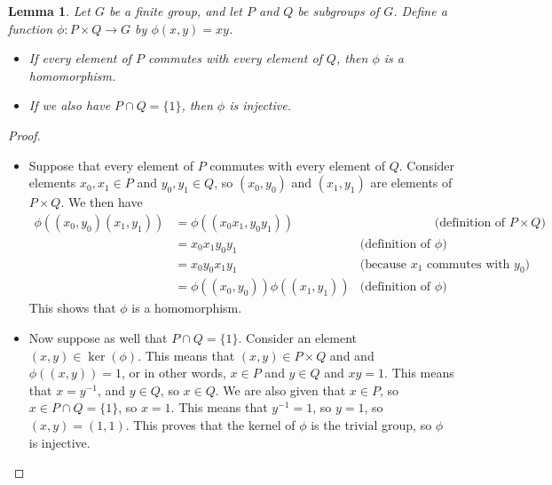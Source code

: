 \documentclass{amsart}
\newcommand{\tm}        {\times}
\newcommand{\xra}       {\xrightarrow}
\renewcommand{\:}{\colon}
\newtheorem{lemma}[theorem]{Lemma}
\theoremstyle{definition}
\begin{document}
\begin{lemma}\label{lem-commuting-product}
 Let $G$ be a finite group, and let $P$ and $Q$ be subgroups of $G$.
 Define a function $\phi\:P\tm Q\xra{}G$ by $\phi(x,y)=xy$.
 \begin{itemize}
  \item[(a)] If every element of $P$ commutes with every element of
   $Q$, then $\phi$ is a homomorphism.
  \item[(b)] If we also have $P\cap Q=\{1\}$, then $\phi$ is
   injective.  
 \end{itemize}
\end{lemma}
\begin{proof}
 \begin{itemize}
  \item[(a)] Suppose that every element of $P$ commutes with every
   element of $Q$.  Consider elements $x_0,x_1\in P$ and
   $y_0,y_1\in Q$, so $(x_0,y_0)$ and $(x_1,y_1)$ are elements of
   $P\tm Q$.  We then have
   \[ \begin{array}{rlr}
    \phi((x_0,y_0)(x_1,y_1)) &\!\!=
        \phi((x_0x_1,y_0y_1)) & 
         \hspace{6em} \text{(definition of $P\tm Q$)} \\
     &\!\!= x_0x_1y_0y_1 & \text{(definition of $\phi$)}\\
     &\!\!= x_0y_0x_1y_1 & \text{(because $x_1$ commutes with $y_0$)} \\
     &\!\!= \phi((x_0,y_0)) \phi((x_1,y_1)) 
         & \text{(definition of $\phi$)}
   \end{array} \]
   This shows that $\phi$ is a homomorphism.
  \item[(b)] Now suppose as well that $P\cap Q=\{1\}$.  Consider an
   element $(x,y)\in\ker(\phi)$.  This means that $(x,y)\in P\tm Q$ and
   and $\phi((x,y))=1$, or in other words, $x\in P$ and $y\in Q$ and
   $xy=1$.  This means that $x=y^{-1}$, and $y\in Q$, so $x\in Q$.  We
   are also given that $x\in P$, so $x\in P\cap Q=\{1\}$, so $x=1$.
   This means that $y^{-1}=1$, so $y=1$, so $(x,y)=(1,1)$.  This
   proves that the kernel of $\phi$ is the trivial group, so $\phi$ is
   injective. 
 \end{itemize}
\end{proof}
\end{document}
